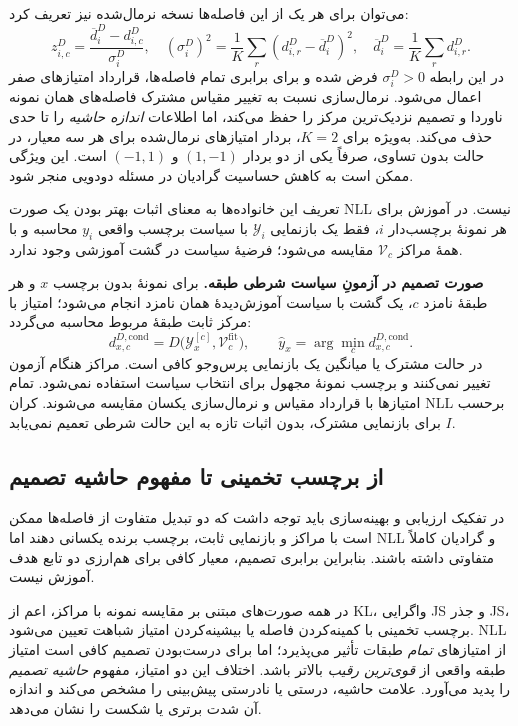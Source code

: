 می‌توان برای هر یک از این فاصله‌ها نسخه
نرمال‌شده نیز تعریف کرد:
\begin{equation}\label{eq:ch3-normalized-distance-family}
\boxed{
z_{i,c}^{D}
=\frac{\overline d_i^{D}-d_{i,c}^{D}}
{\sigma_i^D},
\quad
(\sigma_i^D)^2
=\frac1K\sum_r(d_{i,r}^{D}-\overline d_i^D)^2,
\quad
\overline d_i^D=\frac1K\sum_r d_{i,r}^D.
}
\end{equation}
در این رابطه $\sigma_i^D>0$ فرض شده و برای
برابری تمام فاصله‌ها، قرارداد امتیازهای صفر
اعمال می‌شود. نرمال‌سازی نسبت به تغییر مقیاس
مشترک فاصله‌های همان نمونه ناوردا و تصمیم
نزدیک‌ترین مرکز را حفظ می‌کند، اما اطلاعات
\emph{اندازه حاشیه} را تا حدی حذف می‌کند.
به‌ویژه برای $K=2$، بردار امتیازهای
نرمال‌شده برای هر سه معیار، در حالت بدون تساوی،
صرفاً یکی از دو بردار $(1,-1)$ و $(-1,1)$
است. این ویژگی ممکن است به کاهش حساسیت
گرادیان در مسئله دودویی منجر شود.

تعریف این خانواده‌ها به معنای اثبات بهتر بودن
یک صورت NLL نیست. در آموزش برای هر نمونهٔ
برچسب‌دار $i$، فقط یک بازنمایی
$\mathscr Y_i$ با سیاست برچسب واقعی $y_i$
محاسبه و با همهٔ مراکز $\mathcal V_c$
مقایسه می‌شود؛ فرضیهٔ سیاست در گشت
آموزشی وجود ندارد.

\noindent\textbf{صورت تصمیم در آزمونِ سیاست شرطی طبقه.}
برای نمونهٔ بدون برچسب $x$ و هر
طبقهٔ نامزد $c$، یک گشت با سیاست
آموزش‌دیدهٔ همان نامزد انجام می‌شود؛
امتیاز با مرکز ثابت طبقهٔ مربوط محاسبه می‌گردد:
\[
d_{x,c}^{D,\mathrm{cond}}
=D\bigl(\mathscr Y_x^{[c]},\mathcal V_c^{\mathrm{fit}}\bigr),
\qquad
\widehat y_x=\arg\min_c d_{x,c}^{D,\mathrm{cond}}.
\]
در حالت مشترک یا میانگین یک
بازنمایی پرس‌وجو کافی است. مراکز
هنگام آزمون تغییر نمی‌کنند و
برچسب نمونهٔ مجهول برای انتخاب سیاست
استفاده نمی‌شود. تمام امتیازها
با قرارداد مقیاس و نرمال‌سازی
یکسان مقایسه می‌شوند.
کران NLL برحسب $I$ برای بازنمایی
مشترک، بدون اثبات تازه به
این حالت شرطی تعمیم نمی‌یابد.


\subsection{از برچسب تخمینی تا مفهوم حاشیه تصمیم}
\label{subsec:ch3-label-estimation-to-margin}

در تفکیک ارزیابی و بهینه‌سازی باید
توجه داشت که دو تبدیل متفاوت از فاصله‌ها
ممکن است با مراکز و بازنمایی ثابت،
برچسب برنده یکسانی دهند اما NLL و
گرادیان کاملاً متفاوتی داشته باشند.
بنابراین برابری تصمیم، معیار کافی
برای هم‌ارزی دو تابع هدف آموزش نیست.

در همه صورت‌های مبتنی بر مقایسه نمونه
با مراکز، اعم از KL، واگرایی JS و
جذر JS، برچسب تخمینی با کمینه‌کردن
فاصله یا بیشینه‌کردن امتیاز
شباهت تعیین می‌شود.
NLL از امتیازهای \emph{تمام}
طبقات تأثیر می‌پذیرد؛
اما برای درست‌بودن تصمیم کافی است
امتیاز طبقه واقعی از \emph{قوی‌ترین
رقیب} بالاتر باشد. اختلاف این دو
امتیاز، مفهوم \emph{حاشیه تصمیم}
را پدید می‌آورد. علامت حاشیه،
درستی یا نادرستی پیش‌بینی را
مشخص می‌کند و اندازه آن شدت
برتری یا شکست را نشان می‌دهد.

